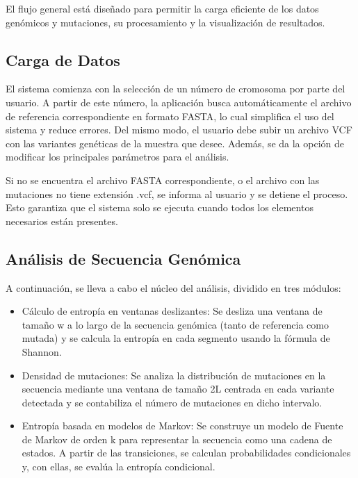 \documentclass[11pt,spanish,listoffigures,listoftables]{tfgetsinf}
\begin{document}
El flujo general está diseñado para permitir la carga eficiente de los datos genómicos y mutaciones, su procesamiento y la visualización de resultados. 

\subsection{Carga de Datos}

El sistema comienza con la selección de un número de cromosoma por parte del usuario. A partir de este número, la aplicación busca automáticamente el archivo de referencia correspondiente en formato \ac{FASTA}, lo cual simplifica el uso del sistema y reduce errores. Del mismo modo, el usuario debe subir un archivo \ac{VCF} con las variantes genéticas de la muestra que desee. Además, se da la opción de modificar los principales parámetros para el análisis. 

Si no se encuentra el archivo \ac{FASTA} correspondiente, o el archivo con las mutaciones no tiene extensión .vcf, se informa al usuario y se detiene el proceso. Esto garantiza que el sistema solo se ejecuta cuando todos los elementos necesarios están presentes. 

\subsection{Análisis de Secuencia Genómica}

A continuación, se lleva a cabo el núcleo del análisis, dividido en tres módulos: 


\begin{itemize}
   \item Cálculo de entropía en ventanas deslizantes: Se desliza una ventana de tamaño w a lo largo de la secuencia genómica (tanto de referencia como mutada) y se calcula la entropía en cada segmento usando la fórmula de Shannon. 
   \item Densidad de mutaciones: Se analiza la distribución de mutaciones en la secuencia mediante una ventana de tamaño 2L centrada en cada variante detectada y se contabiliza el número de mutaciones en dicho intervalo. 
   \item Entropía basada en modelos de Markov: Se construye un modelo de Fuente de Markov de orden k para representar la secuencia como una cadena de estados. A partir de las transiciones, se calculan probabilidades condicionales y, con ellas, se evalúa la entropía condicional. 
\end{itemize}
\end{document}
